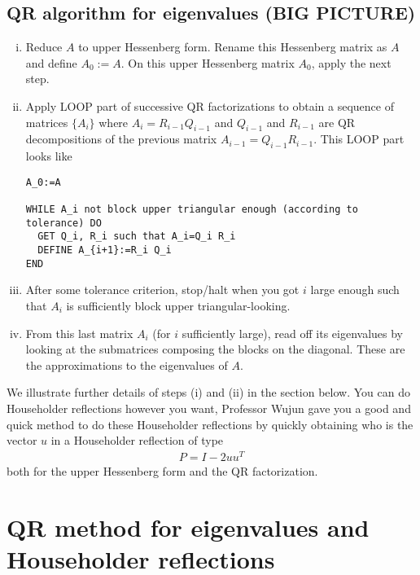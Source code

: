 \documentclass[11.5pt]{article}
\theoremstyle{definition}
\begin{document}
\subsection*{QR algorithm for eigenvalues (BIG PICTURE)}
\begin{enumerate}[(i)]
\item Reduce $A$ to upper Hessenberg form. Rename this Hessenberg matrix as $A$ and define $A_0:=A$. On this upper Hessenberg matrix $A_0$, apply the next step.  
\item  Apply LOOP part of successive QR factorizations to obtain a sequence of matrices $\{A_i\}$ where $A_i=R_{i-1}Q_{i-1}$ and $Q_{i-1}$ and $R_{i-1}$ are QR decompositions of the previous matrix $A_{i-1}=Q_{i-1}R_{i-1}$. This LOOP part looks like\\


\begin{lstlisting}[label=listing1, caption=LOOP ,  frame=tb] 
A_0:=A

WHILE A_i not block upper triangular enough (according to tolerance) DO
  GET Q_i, R_i such that A_i=Q_i R_i
  DEFINE A_{i+1}:=R_i Q_i
END
\end{lstlisting}

 

 
\item After some tolerance criterion, stop/halt when you got $i$ large enough such that $A_i$ is sufficiently block upper triangular-looking.
\item From this last matrix $A_i$ (for $i$ sufficiently large), read off its eigenvalues by looking at the submatrices composing the blocks on the diagonal. These are the approximations to the eigenvalues of $A$.
\end{enumerate}
We illustrate further details of steps (i) and (ii) in the section below. You can do Householder reflections however you want, Professor Wujun gave you a good and quick method to do these Householder reflections by quickly obtaining who is the vector $u$ in a Householder reflection of type
\begin{align*}
P=I-2uu^T
\end{align*}
both for the upper Hessenberg form and the QR factorization. 

\section{QR method for eigenvalues and Householder reflections}

 
\end{document}
